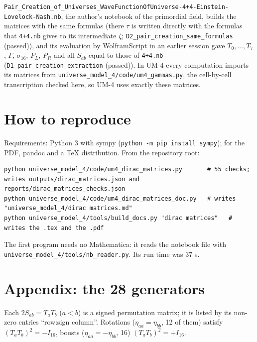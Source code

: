 \documentclass[
  10pt,
]{article}
\begin{document}
\texttt{Pair\_Creation\_of\_Universes\_WaveFunctionOfUniverse-4+4-Einstein-Lovelock-Nash.nb},
the author's notebook of the primordial field, builds the matrices with
the same formulas (there \(\tau\) is written directly with the formulas
that \texttt{4+4.nb} gives to its intermediate \(\zeta\);
\texttt{D2\_pair\_creation\_same\_formulas} (passed)), and its
evaluation by WolframScript in an earlier session gave
\(T_0, \dots, T_7\), \(\Gamma\), \(\sigma_{16}\), \(P_L\), \(P_R\) and
all \(S_{ab}\) equal to those of \texttt{4+4.nb}
(\texttt{D1\_pair\_creation\_extraction} (passed)). In UM-4 every
computation imports its matrices from
\texttt{universe\_model\_4/code/um4\_gammas.py}, the cell-by-cell
transcription checked here, so UM-4 uses exactly these matrices.

\hypertarget{how-to-reproduce}{%
\section{How to reproduce}\label{how-to-reproduce}}

Requirements: Python 3 with sympy
(\texttt{python\ -m\ pip\ install\ sympy}); for the PDF, pandoc and a
TeX distribution. From the repository root:

\begin{verbatim}
python universe_model_4/code/um4_dirac_matrices.py       # 55 checks; writes outputs/dirac_matrices.json and reports/dirac_matrices_checks.json
python universe_model_4/code/um4_dirac_matrices_doc.py   # writes "universe_model_4/dirac matrices.md"
python universe_model_4/tools/build_docs.py "dirac matrices"   # writes the .tex and the .pdf
\end{verbatim}

The first program needs no Mathematica: it reads the notebook file with
\texttt{universe\_model\_4/tools/nb\_reader.py}. Its run time was 37 s.

\hypertarget{appendix-the-28-generators}{%
\section{Appendix: the 28 generators}\label{appendix-the-28-generators}}

Each \(2S_{ab} = T_aT_b\) (\(a < b\)) is a signed permutation matrix; it
is listed by its non-zero entries ``row:sign column''. Rotations
(\(\eta_{aa} = \eta_{bb}\), 12 of them) satisfy
\((T_aT_b)^2 = -I_{16}\), boosts (\(\eta_{aa} = -\eta_{bb}\), 16)
\((T_aT_b)^2 = +I_{16}\).
\end{document}
